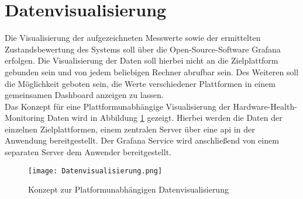 \newpage
\section{Datenvisualisierung}\label{sec:Datenvisualisierung}
Die Visualisierung der aufgezeichneten Messwerte sowie der ermittelten Zustandsbewertung des Systems soll über die Open-Source-Software Grafana erfolgen. Die Visualisierung der Daten soll hierbei nicht an die Zielplattform gebunden sein und von jedem beliebigen Rechner abrufbar sein. Des Weiteren soll die Möglichkeit geboten sein, die Werte verschiedener Plattformen in einem gemeinsamen Dashboard anzeigen zu lassen.\\
Das Konzept für eine Plattformunabhängige Visualisierung der Hardware-Health-Monitoring Daten wird in Abbildung \ref{fig:DatenvisualisierungKonzept} gezeigt. Hierbei werden die Daten der einzelnen Zielplattformen, einem zentralen Server über eine \ac{api} in der Anwendung bereitgestellt. Der Grafana Service wird anschließend von einem separaten Server dem Anwender bereitgestellt.   
\begin{center}
    \begin{figure}[h!]
        \captionsetup{justification=centering,format=plain, font=small}
        \centering
        \texttt{[image: Datenvisualisierung.png]}
        \caption{Konzept zur Platformunabhängigen Datenvisualisierung}
        \label{fig:DatenvisualisierungKonzept}
    \end{figure}
\end{center}

